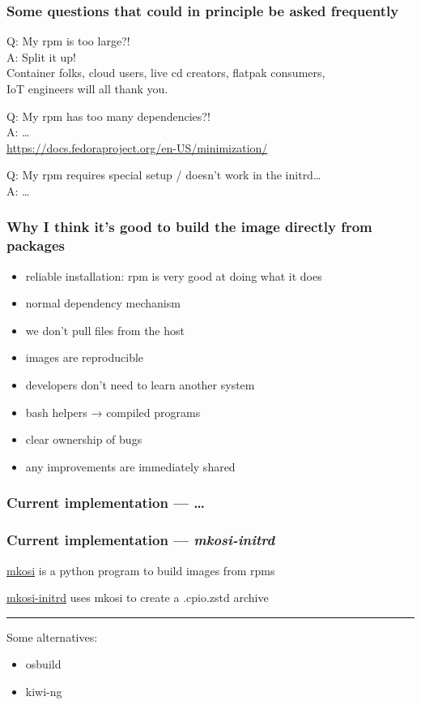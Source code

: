 \documentclass[]{beamer}
\begin{document}
\begin{frame}
  \frametitle{Some questions that could in principle be asked frequently}

  Q: My rpm is too large?!\\\pause
  A: Split it up!\\
  \phantom{A: }Container folks, cloud users, live cd creators, flatpak consumers,\\
  \phantom{A: }IoT engineers will all thank you.

  \bigskip
  \pause

  Q: My rpm has too many dependencies?!\\
  A: … \\\phantom{A: }
     \url{https://docs.fedoraproject.org/en-US/minimization/}

  \bigskip
  \pause

  Q: My rpm requires special setup / doesn't work in the initrd…\\
  A: …\\\phantom{A: }

\end{frame}

\begin{frame}
  \frametitle{Why I think it's good to build the image directly from packages}

  \begin{itemize}
  \item reliable installation: rpm is very good at doing what it does
  \item normal dependency mechanism
  \item we don't pull files from the host
  \item images are reproducible
  \item developers don't need to learn another system
  \item bash helpers → compiled programs
  \item clear ownership of bugs
  \item any improvements are immediately shared
  \end{itemize}
\end{frame}

\begin{frame}
  \frametitle{Current implementation — …}
\end{frame}

\begin{frame}
  \frametitle{Current implementation — \emph{mkosi-initrd}}

  \href{https://github.com/systemd/mkosi}{mkosi} is a python program to build images from rpms

  \href{https://github.com/keszybz/mkosi-initrd}{mkosi-initrd} uses mkosi to create a .cpio.zstd archive

  \bigskip

  \hrule

  \bigskip
  \pause

  Some alternatives:
  \begin{itemize}
  \item osbuild
  \item kiwi-ng
  \end{itemize}
\end{frame}
\end{document}
